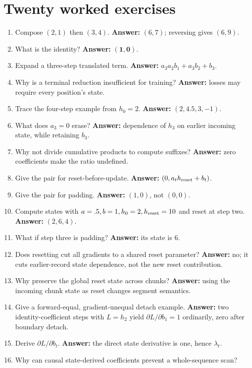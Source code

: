 \section{Twenty worked exercises}
\begin{enumerate}
\item Compose $(2,1)$ then $(3,4)$.
\textbf{Answer:} $(6,7)$; reversing gives $(6,9)$.
\item What is the identity?
\textbf{Answer:} $(\mathbf1,\mathbf0)$.
\item Expand a three-step translated term.
\textbf{Answer:} $a_3a_2b_1+a_3b_2+b_3$.
\item Why is a terminal reduction insufficient for training?
\textbf{Answer:} losses may require every position's state.
\item Trace the four-step example from $h_0=2$.
\textbf{Answer:} $(2,4.5,3,-1)$.
\item What does $a_3=0$ erase?
\textbf{Answer:} dependence of $h_3$ on earlier incoming state, while retaining $b_3$.
\item Why not divide cumulative products to compute suffixes?
\textbf{Answer:} zero coefficients make the ratio undefined.
\item Give the pair for reset-before-update.
\textbf{Answer:} $(0,a_t h_{\rm reset}+b_t)$.
\item Give the pair for padding.
\textbf{Answer:} $(1,0)$, not $(0,0)$.
\item Compute states with $a=.5,b=1,h_0=2,h_{\rm reset}=10$ and reset at step two.
\textbf{Answer:} $(2,6,4)$.
\item What if step three is padding?
\textbf{Answer:} its state is $6$.
\item Does resetting cut all gradients to a shared reset parameter?
\textbf{Answer:} no; it cuts earlier-record state dependence, not the new reset contribution.
\item Why preserve the global reset state across chunks?
\textbf{Answer:} using the incoming chunk state as reset changes segment semantics.
\item Give a forward-equal, gradient-unequal detach example.
\textbf{Answer:} two identity-coefficient steps with $L=h_2$ yield
$\partial L/\partial b_1=1$ ordinarily, zero after boundary detach.
\item Derive $\partial L/\partial b_t$.
\textbf{Answer:} the direct state derivative is one, hence $\lambda_t$.
\item Why can causal state-derived coefficients prevent a whole-sequence scan?

\end{enumerate}
